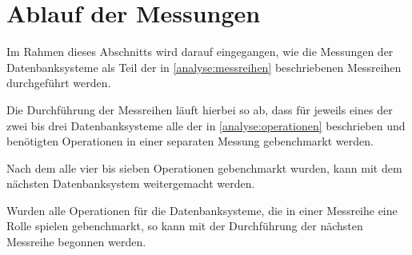 \section{Ablauf der Messungen}
Im Rahmen dieses Abschnitts wird darauf eingegangen, wie die Messungen der Datenbanksysteme als Teil der in \autoref{analyse:messreihen} beschriebenen Messreihen durchgeführt werden. 

Die Durchführung der Messreihen läuft hierbei so ab, dass für jeweils eines der zwei bis drei Datenbanksysteme alle der in \autoref{analyse:operationen} beschrieben und benötigten Operationen in einer separaten Messung gebenchmarkt werden. 

Nach dem alle vier bis sieben Operationen gebenchmarkt wurden, kann mit dem nächsten Datenbanksystem weitergemacht werden. 

Wurden alle Operationen für die Datenbanksysteme, die in einer Messreihe eine Rolle spielen gebenchmarkt, so kann mit der Durchführung der nächsten Messreihe begonnen werden. 


